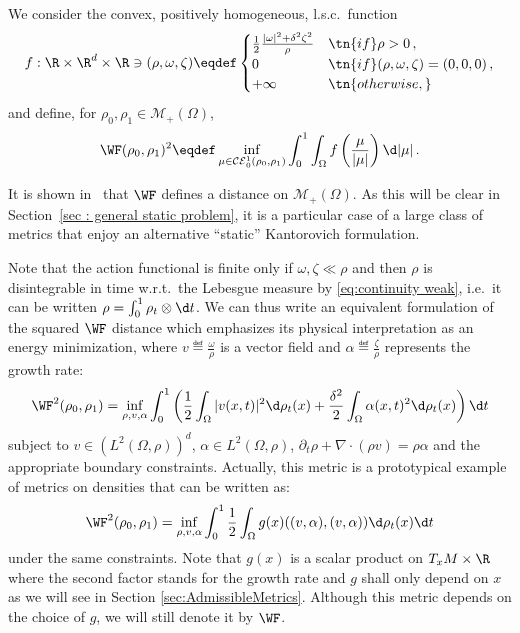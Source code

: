 \begin{definition}
We consider the convex, positively homogeneous, l.s.c.\ function
\[ 
f : \R \times \R^d \times \R \ni (\rho,\omega, \zeta) \eqdef
\begin{cases}
\frac12 \frac{|\omega|^2+ \delta^2 \zeta^2}{\rho} & \tn{if } \rho>0 \, ,\\
0 & \tn{ if } (\rho,\omega,\zeta)=(0,0,0)\, , \\
+ \infty & \tn{ otherwise,} 
\end{cases} 
\]
and define, for $\rho_0,\rho_1 \in \mathcal{M}_+(\Omega)$,
\[
	\WF(\rho_0,\rho_1)^2 \eqdef 
	\inf_{\mu \in \mathcal{CE}_0^1(\rho_0,\rho_1)} \int_0^1 \int_{\Omega} f\left( \frac{\mu}{|\mu|} \right) \d |\mu|  \, .
\]
\end{definition}

It is shown in~\cite{ChizatOTFR2015,new2015kondratyev} that $\WF$ defines a distance on $\mathcal{M}_+(\Omega)$. As this will be clear in Section~\ref{sec : general static problem}, it is a particular case of a large class of metrics that enjoy an alternative ``static'' Kantorovich formulation. 

Note that the action functional is finite only if $\omega, \zeta \ll \rho$ and then $\rho$ is disintegrable in time w.r.t.\ the Lebesgue measure by \eqref{eq:continuity weak}, i.e.\ it can be written $\rho = \int_0^1 \rho_t \otimes \d t$. We can thus write an equivalent formulation of the squared $\WF$ distance which emphasizes its physical interpretation as an energy minimization, where $v \eqdef \frac{\omega}{\rho}$ is a vector field and $\alpha \eqdef \frac{\zeta}{\rho}$ represents the growth rate:
\begin{equation}\label{WF}
\WF^2(\rho_0,\rho_1) = \inf_{\rho,v, \alpha} \int_0^1 \left(\frac12 \int_\Omega  |v(x,t)|^2 \d \rho_t(x) + \frac{\delta^2}{2}  \int_\Omega  \alpha(x,t)^2 \d \rho_t(x) \right) \d t 
\end{equation}
subject to $v \in (L^2(\Omega, \rho))^d$, $\alpha \in L^2(\Omega, \rho)$, $ \partial_t \rho + \nabla \cdot (\rho v) = \rho \alpha $ and the appropriate boundary constraints.
Actually, this metric is a prototypical example of metrics on densities that can be written as:
\begin{equation}\label{WFgeneralized}
\WF^2(\rho_0,\rho_1) = \inf_{\rho,v, \alpha} \int_0^1 \frac12 \int_\Omega  g(x)((v,\alpha),(v,\alpha)) \d \rho_t(x)  \d t 
\end{equation}
under the same constraints. Note that $g(x)$ is a scalar product on $T_xM \times \R	$ where the second factor stands for the growth rate and $g$ shall only depend on $x$ as we will see in Section \ref{sec:AdmissibleMetrics}. Although this metric depends on the choice of $g$, we will still denote it by $\WF$.

